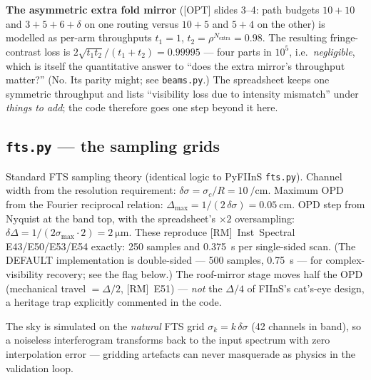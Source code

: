 \documentclass[11pt]{article}
\newcommand{\code}[1]{\texttt{\small #1}}
\newcommand{\file}[1]{\textcolor{plumdark}{\texttt{\small #1}}}
\begin{document}
\begin{decisionbox}
\textbf{The asymmetric extra fold mirror} ([OPT] slides 3--4: path budgets
$10{+}10$ and $3{+}5{+}6{+}\delta$ on one routing versus $10{+}5$ and $5{+}4$
on the other) is modelled as per-arm throughputs $t_1 = 1$,
$t_2 = \rho^{N_\mathrm{extra}} = 0.98$. The resulting fringe-contrast loss is
$2\sqrt{t_1 t_2}/(t_1+t_2) = 0.99995$ --- four parts in $10^5$, i.e.\
\emph{negligible}, which is itself the quantitative answer to ``does the
extra mirror's throughput matter?'' (No. Its parity might; see
\file{beams.py}.) The spreadsheet keeps one symmetric throughput and lists
``visibility loss due to intensity mismatch'' under \emph{things to add}; the
code therefore goes one step beyond it here.
\end{decisionbox}

\subsection{\file{fts.py} --- the sampling grids}

\begin{physicsbox}
Standard FTS sampling theory (identical logic to PyFIInS \code{fts.py}).
Channel width from the resolution requirement:
$\delta\sigma = \sigma_c/R = \SI{10}{\per\centi\metre}$. Maximum OPD from the
Fourier reciprocal relation: $\Delta_{\max} = 1/(2\,\delta\sigma) =
\SI{0.05}{\centi\metre}$. OPD step from Nyquist at the band top, with the
spreadsheet's $\times 2$ oversampling: $\delta\Delta =
1/(2\sigma_{\max}\cdot 2) = \SI{2}{\micro\metre}$. These reproduce
[RM]~Inst~Spectral E43/E50/E53/E54 exactly: 250 samples and \SI{0.375}{\second}
per single-sided scan. (The DEFAULT implementation is double-sided ---
500 samples, \SI{0.75}{\second} --- for complex-visibility recovery; see the
flag below.) The roof-mirror stage moves half the OPD
(mechanical travel $=\Delta/2$, [RM]~E51) --- \emph{not} the $\Delta/4$ of
FIInS's cat's-eye design, a heritage trap explicitly commented in the code.
\end{physicsbox}

The sky is simulated on the \emph{natural} FTS grid
$\sigma_k = k\,\delta\sigma$ (42 channels in band), so a noiseless
interferogram transforms back to the input spectrum with zero interpolation
error --- gridding artefacts can never masquerade as physics in the validation
loop.
\end{document}
